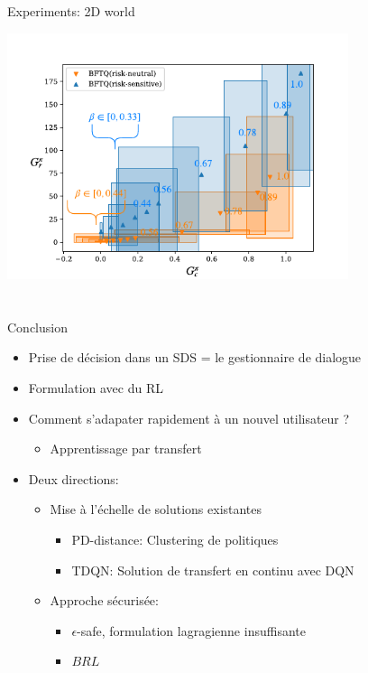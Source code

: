 \documentclass[french,handout]{beamer}
\begin{document}
    \begin{frame}{Experiments: 2D world}
        \begin{center}
            \includegraphics[page=1, width=0.75\textwidth]{img/corridors}
        \end{center}
    \end{frame}

    \section{}
    \subsection{}
    \begin{frame}{Conclusion}
        \begin{itemize}
            \item Prise de décision dans un SDS = le gestionnaire de dialogue
            \item Formulation avec du RL
            \item Comment s'adapater rapidement à un nouvel utilisateur ?
            \begin{itemize}
                \item Apprentissage par transfert
            \end{itemize}
            \item Deux directions:
            \begin{itemize}
                \item Mise à l'échelle de solutions existantes
                \begin{itemize}
                    \item PD-distance: Clustering de politiques
                    \item TDQN: Solution de transfert en continu avec DQN
                \end{itemize}
                \item Approche sécurisée:
                \begin{itemize}
                    \item $\epsilon$-safe, formulation lagragienne insuffisante
                    \item $BRL$
                \end{itemize}
            \end{itemize}
        \end{itemize}
    \end{frame}


\end{document}
